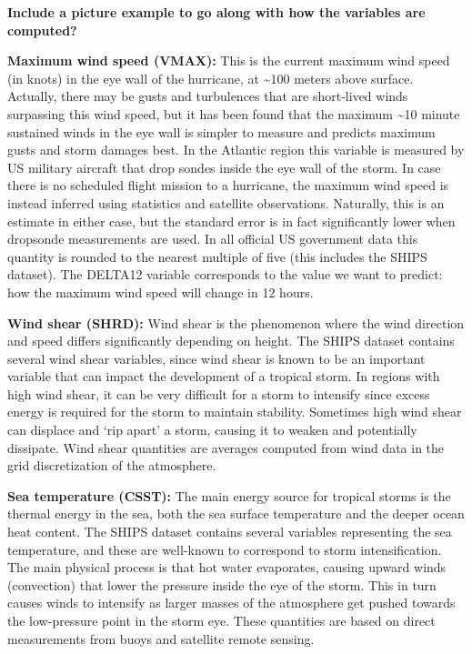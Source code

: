 \documentclass[
]{article}
\begin{document}
\textbf{Include a picture example to go along with how the variables are
computed?}

\textbf{Maximum wind speed (VMAX):} This is the current maximum wind
speed (in knots) in the eye wall of the hurricane, at \textasciitilde100
meters above surface. Actually, there may be gusts and turbulences that
are short-lived winds surpassing this wind speed, but it has been found
that the maximum \textasciitilde10 minute sustained winds in the eye
wall is simpler to measure and predicts maximum gusts and storm damages
best. In the Atlantic region this variable is measured by US military
aircraft that drop sondes inside the eye wall of the storm. In case
there is no scheduled flight mission to a hurricane, the maximum wind
speed is instead inferred using statistics and satellite observations.
Naturally, this is an estimate in either case, but the standard error is
in fact significantly lower when dropsonde measurements are used. In all
official US government data this quantity is rounded to the nearest
multiple of five (this includes the SHIPS dataset). The DELTA12 variable
corresponds to the value we want to predict: how the maximum wind speed
will change in 12 hours.

\textbf{Wind shear (SHRD):} Wind shear is the phenomenon where the wind
direction and speed differs significantly depending on height. The SHIPS
dataset contains several wind shear variables, since wind shear is known
to be an important variable that can impact the development of a
tropical storm. In regions with high wind shear, it can be very
difficult for a storm to intensify since excess energy is required for
the storm to maintain stability. Sometimes high wind shear can displace
and `rip apart' a storm, causing it to weaken and potentially dissipate.
Wind shear quantities are averages computed from wind data in the grid
discretization of the atmosphere.

\textbf{Sea temperature (CSST):} The main energy source for tropical
storms is the thermal energy in the sea, both the sea surface
temperature and the deeper ocean heat content. The SHIPS dataset
contains several variables representing the sea temperature, and these
are well-known to correspond to storm intensification. The main physical
process is that hot water evaporates, causing upward winds (convection)
that lower the pressure inside the eye of the storm. This in turn causes
winds to intensify as larger masses of the atmosphere get pushed towards
the low-pressure point in the storm eye. These quantities are based on
direct measurements from buoys and satellite remote sensing.
\end{document}
